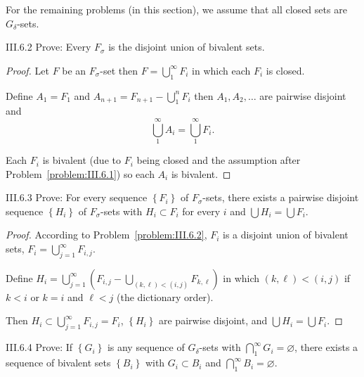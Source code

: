 For the remaining problems (in this section), we assume that all closed sets are \(G_{\delta}\)-sets.

\begin{problem}{III.6.2}\label{problem:III.6.2}
Prove: Every \(F_{\sigma}\) is the disjoint union of bivalent sets.
\end{problem}

\begin{proof}
	Let \(F\) be an \(F_{\sigma}\)-set then \( F = \bigcup^{\infty}_{1} F_{i} \) in which each \(F_{i}\) is closed.

	Define \(A_{1} = F_{1}\) and \(A_{n+1} = F_{n+1} - \bigcup^{n}_{1} F_{i}\) then \( A_{1}, A_{2}, \ldots \) are pairwise disjoint and
	\[
		\bigcup^{\infty}_{1} A_{i} = \bigcup^{\infty}_{1} F_{i}.
	\]

	Each \(F_{i}\) is bivalent (due to \(F_{i}\) being closed and the assumption after Problem~\ref{problem:III.6.1}) so each \(A_{i}\) is bivalent.
\end{proof}

\begin{problem}{III.6.3}\label{problem:III.6.3}
Prove: For every sequence \( \left\{ F_{i} \right\} \) of \(F_{\sigma}\)-sets, there exists a pairwise disjoint sequence \( \left\{ H_{i} \right\} \) of \(F_{\sigma}\)-sets with \(H_{i} \subset F_{i}\) for every \(i\) and \( \bigcup H_{i} = \bigcup F_{i} \).
\end{problem}

\begin{proof}
	According to Problem~\ref{problem:III.6.2}, \( F_{i} \) is a disjoint union of bivalent sets, \( F_{i} = \bigcup^{\infty}_{j=1} F_{i,j} \).

	Define \( H_{i} = \bigcup^{\infty}_{j=1} \left(F_{i,j} - \bigcup_{(k,\ell) < (i,j)} F_{k,\ell}\right) \) in which \( (k,\ell) < (i,j) \) if \( k < i \) or \( k = i \) and \( \ell < j \) (the dictionary order).

	Then \( H_{i} \subset \bigcup^{\infty}_{j=1} F_{i,j} = F_{i} \), \( \left\{ H_{i} \right\} \) are pairwise disjoint, and \( \bigcup H_{i} = \bigcup F_{i} \).
\end{proof}

\begin{problem}{III.6.4}\label{problem:III.6.4}
Prove: If \( \left\{ G_{i} \right\} \) is any sequence of \(G_{\delta}\)-sets with \( \bigcap^{\infty}_{1} G_{i} = \varnothing \), there exists a sequence of bivalent sets \( \left\{ B_{i} \right\} \) with \(G_{i} \subset B_{i}\) and \( \bigcap^{\infty}_{1} B_{i} = \varnothing \).
\end{problem}

